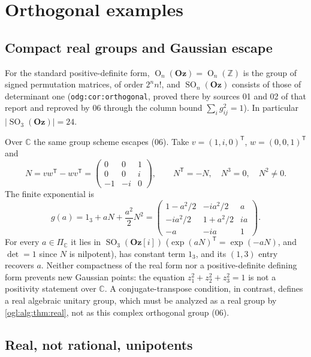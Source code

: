 \documentclass[11pt,oneside]{article}
\numberwithin{equation}{section}
\theoremstyle{definition}
\theoremstyle{remark}
\newcommand{\Oz}{\mathbf{Oz}}
\newcommand{\GOz}{\mathbf{Oz}[i]}
\newcommand{\Z}{\mathbb Z}
\newcommand{\C}{\mathbb C}
\newcommand{\SO}{\operatorname{SO}}
\newcommand{\OO}{\operatorname{O}}
\newcommand{\replabel}[1]{\nolinkurl{#1}}
\begin{document}
\section{Orthogonal examples}\label{ogl:alg:sec:examples}

\subsection{Compact real groups and Gaussian escape}

For the standard positive-definite form, $\OO_n(\Oz)=\OO_n(\Z)$ is the group of
signed permutation matrices, of order $2^nn!$, and $\SO_n(\Oz)$ consists of
those of determinant one (\replabel{odg:cor:orthogonal}, proved there by
sources 01 and 02 of that report and reproved by 06 through the column bound
$\sum_ig_{ij}^2=1$). In particular $|\SO_3(\Oz)|=24$.

Over $\C$ the same group scheme escapes (06). Take
$v=(1,i,0)^{\mathsf T}$, $w=(0,0,1)^{\mathsf T}$ and
\[
 N=vw^{\mathsf T}-wv^{\mathsf T}
 =\begin{pmatrix}0&0&1\\0&0&i\\-1&-i&0\end{pmatrix},
 \qquad N^{\mathsf T}=-N,\quad N^3=0,\quad N^2\ne0.
\]
The finite exponential is
\begin{equation}\label{ogl:alg:eq:complexexample}
 g(a)=1_3+aN+\frac{a^2}{2}N^2
 =\begin{pmatrix}
 1-a^2/2&-ia^2/2&a\\
 -ia^2/2&1+a^2/2&ia\\
 -a&-ia&1
 \end{pmatrix}.
\end{equation}
For every $a\in\Pi_\C$ it lies in $\SO_3(\GOz)$ ($\exp(aN)^{\mathsf T}=\exp(-aN)$,
and $\det=1$ since $N$ is nilpotent), has constant term $1_3$, and its
$(1,3)$ entry recovers $a$. Neither compactness of the real form nor a
positive-definite defining form prevents new Gaussian points: the equation
$z_1^2+z_2^2+z_3^2=1$ is not a positivity statement over $\C$. A
conjugate-transpose condition, in contrast, defines a real algebraic unitary
group, which must be analyzed as a real group by \cref{ogl:alg:thm:real}, not as
this complex orthogonal group (06).

\subsection{Real, not rational, unipotents}
\end{document}
